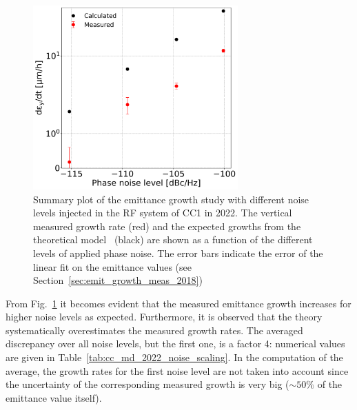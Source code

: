 \begin{figure}[!h]
   \centering         
   \includegraphics[width=0.7\textwidth]{images/Ch8/emit_V_background_subtracted_noise_scan.png}
       \caption{Summary plot of the emittance growth study with different noise levels injected in the RF system of CC1 in 2022. The vertical measured growth rate (red) and the expected growths from the theoretical model~\cite{PhysRevSTAB.18.101001} (black) are shown as a function of the different levels of applied phase noise. The error bars indicate the error of the linear fit on the emittance values (see Section~\ref{sec:emit_growth_meas_2018})}
       \label{fig:V_emit_growth_background_subtracted_noise_scan}
\end{figure}

From Fig.~\ref{fig:V_emit_growth_background_subtracted_noise_scan} it becomes evident that the measured emittance growth increases for higher noise levels as expected. Furthermore, it is observed that the theory systematically overestimates the measured growth rates. The averaged discrepancy over all noise levels, but the first one, is a factor 4: numerical values are given in Table~\ref{tab:cc_md_2022_noise_scaling}. In the computation of the average, the growth rates for the first noise level are not taken into account since the uncertainty of the corresponding measured growth is very big ($\sim 50\%$ of the emittance value itself).

